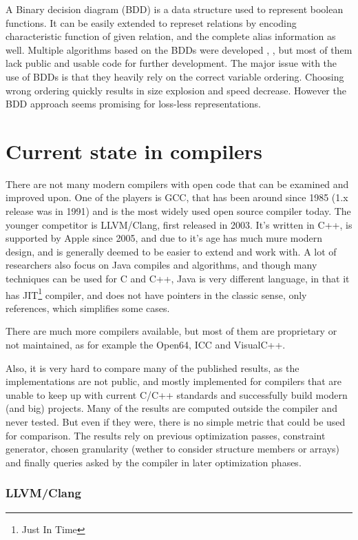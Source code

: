 A Binary decision diagram (BDD) is a data structure used to represent boolean
functions. It can be easily extended to represet relations by encoding
characteristic function of given relation, and the complete alias information as
well. Multiple algorithms based on the BDDs were developed \cite{whaley2004},
\cite{bddbddb}, but most of them lack public and usable code for further
development. The major issue with the use of BDDs is that they heavily rely on
the correct variable ordering. Choosing wrong ordering quickly results in
size explosion and speed decrease. However the BDD approach seems promising for
loss-less representations.

\section{Current state in compilers}

There are not many modern compilers with open code that can be examined and improved
upon. One of the players is GCC, that has been around since 1985
(1.x release was in 1991) and is the most widely used open source compiler
today. The younger competitor is LLVM/Clang, first released in 2003. It's
written in C++, is supported by Apple since 2005, and due to it's age has much
mure modern design, and is generally deemed to be easier to extend and work
with. A lot of researchers also focus on Java compiles and algorithms, and though many
techniques can be used for C and C++, Java is very different language, in that
it has JIT\footnote{Just In Time} compiler, and does not have pointers in the
classic sense, only references, which simplifies some cases.

There are much more compilers available, but most of them are proprietary or not
maintained, as for example the Open64, ICC and VisualC++.

Also, it is very hard to compare many of the published results, as the
implementations are not public, and mostly implemented for compilers that are
unable to keep up with current C/C++ standards and successfully build modern
(and big) projects. Many of the results are computed outside the compiler and
never tested. But even if they were, there is no simple metric that could be
used for comparison. The results rely on previous optimization passes,
constraint generator, chosen granularity (wether to consider structure members or
arrays) and finally queries asked by the compiler in later optimization phases.


\subsubsection{LLVM/Clang}

